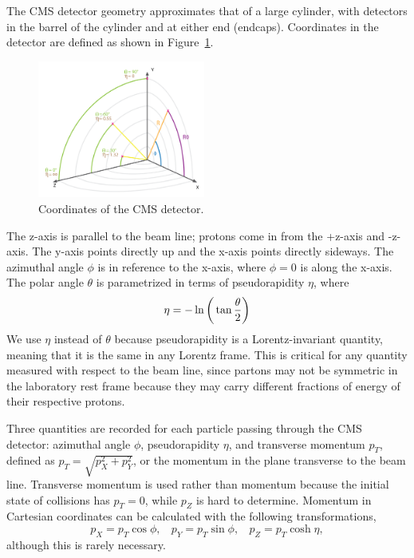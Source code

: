 The CMS detector geometry approximates that of a large cylinder, with detectors in the barrel of the cylinder and at either end (endcaps). Coordinates in the detector are defined as shown in Figure~\ref{Fig:CMS:coordinates}. 
\begin{figure}[h!]
    \centering
    \includegraphics[width=0.49\textwidth]{F3/img_cms_coordinates.png}
    \caption{Coordinates of the CMS detector.}
    \label{Fig:CMS:coordinates}
\end{figure} 
The z-axis is parallel to the beam line; protons come in from the +z-axis and -z-axis. The y-axis points directly up and the x-axis points directly sideways. The azimuthal angle $\phi$ is in reference to the x-axis, where $\phi=0$ is along the x-axis. The polar angle $\theta$ is parametrized in terms of pseudorapidity $\eta$, where 
\begin{equation}
    \eta = -\ln\bigg{(}\tan\frac{\theta}{2}\bigg{)}
\end{equation}
We use $\eta$ instead of $\theta$ because pseudorapidity is a Lorentz-invariant quantity, meaning that it is the same in any Lorentz frame. This is critical for any quantity measured with respect to the beam line, since partons may not be symmetric in the laboratory rest frame because they may carry different fractions of energy of their respective protons.

Three quantities are recorded for each particle passing through the CMS detector: azimuthal angle $\phi$, pseudorapidity $\eta$, and transverse momentum $p_{T}$, defined as $p_{T} = \sqrt{p_{X}^{2}+p_{Y}^{2}}$, or the momentum in the plane transverse to the beam line. Transverse momentum is used rather than momentum because the initial state of collisions has $p_{T}=0$, while $p_{Z}$ is hard to determine. Momentum in Cartesian coordinates can be calculated with the following transformations,
\begin{equation}
p_X = p_T\cos\phi, \ \ \ \ 
p_Y = p_T\sin\phi, \ \ \ \
p_Z = p_T\cosh\eta,
\end{equation}
although this is rarely necessary.
\vspace{5mm}

